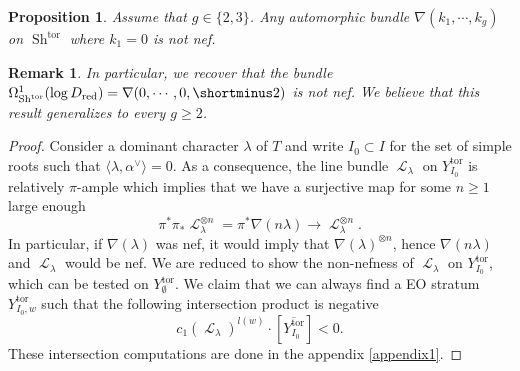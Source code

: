 \documentclass[11pt]{amsart}
\numberwithin{subsection}{section}
\numberwithin{figure}{section}
\numberwithin{table}{section}
\theoremstyle{1}
\newtheorem{proposition}[theorem]{Proposition}
\theoremstyle{2}
\newtheorem{rmrk}[theorem]{Remark}
\DeclareMathOperator{\Sh}{Sh}
\DeclareMathOperator{\tor}{tor}
\DeclareMathOperator{\Lc}{\mathcal{L}}
\DeclareMathOperator{\red}{red}
\begin{document}
\begin{proposition}\label{prop_not_nef}
Assume that $g \in \{2,3\}$. Any automorphic bundle $\nabla(k_1,\cdots,k_g)$ on $\Sh^{\tor}$ where $k_1 = 0$ is not nef.
\end{proposition}
\begin{rmrk}
In particular, we recover that the bundle $\Omega^1_{\Sh^{\tor}}(\log D_{\red}) = \nabla(0,\cdots, 0,\shortminus 2)$ is not nef. We believe that this result generalizes to every $g \geq 2$.
\end{rmrk}
\vspace{0.2cm}
\begin{proof}
Consider a dominant character $\lambda$ of $T$ and write $I_0 \subset I$ for the set of simple roots such that $\langle \lambda,\alpha^{\vee} \rangle = 0$. As a consequence, the line bundle $\Lc_{\lambda}$ on $Y_{I_0}^{\tor}$ is relatively $\pi$-ample which implies that we have a surjective map for some $n \geq 1$ large enough
\begin{equation*}
\pi^*\pi_*\Lc^{\otimes n}_{\lambda} = \pi^*\nabla(n\lambda) \rightarrow \Lc^{\otimes n}_{\lambda}.
\end{equation*}
In particular, if $\nabla(\lambda)$ was nef, it would imply that $\nabla(\lambda)^{\otimes n}$, hence $\nabla(n\lambda)$ and $\Lc_{\lambda}$ would be nef. We are reduced to show the non-nefness of $\Lc_{\lambda}$ on $Y_{I_0}^{\tor}$, which can be tested on $Y_{\emptyset}^{\tor}$. We claim that we can always find a EO stratum $Y_{I_0,w}^{\tor}$ such that the following intersection product is negative
\begin{equation*}
c_1(\Lc_{\lambda})^{l(w)} \cdot [\overline{Y_{I_0}^{\tor}}] < 0.
\end{equation*}
These intersection computations are done in the appendix \ref{appendix1}.
\end{proof}
\end{document}
